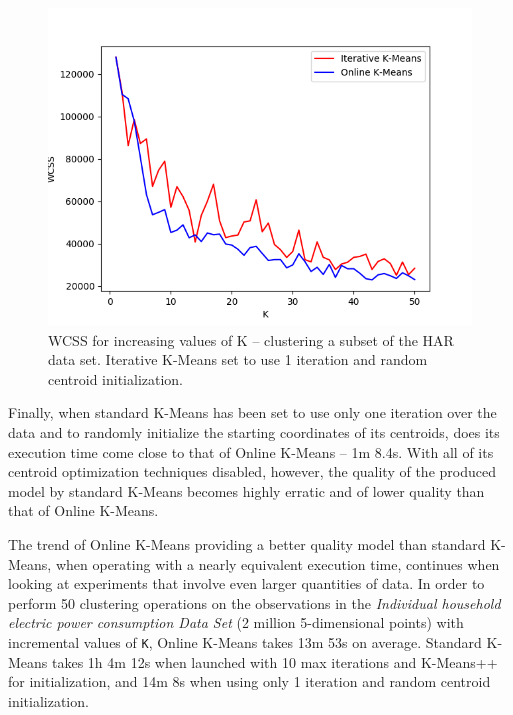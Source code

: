 \documentclass{l4proj}
\begin{document}
\begin{figure}[H]
	\centering
    \label{fig:res5}
    \includegraphics[width=1.0\textwidth]{images/result5}
    \caption{WCSS for increasing values of K -- clustering a subset of the HAR data set. Iterative K-Means set to use 1 iteration and random centroid initialization. } 
\end{figure}

Finally, when standard K-Means has been set to use only one iteration over the data  and to randomly initialize the starting coordinates of its centroids, does its execution time come close to that of Online K-Means -- 1m 8.4s. With all of its centroid optimization techniques disabled, however, the quality of the produced model by standard K-Means becomes highly erratic and of lower quality than that of Online K-Means.


The trend of Online K-Means providing a better quality model than standard K-Means, when operating with a nearly equivalent execution time, continues when looking at experiments that involve even larger quantities of data. In order to perform 50 clustering operations on the observations in the \textit{Individual household electric power consumption Data Set} (2 million 5-dimensional points) with incremental values of \texttt{K}, Online K-Means takes 13m 53s on average. Standard K-Means takes 1h 4m 12s when launched with 10 max iterations and K-Means++ for initialization,  and 14m 8s when using only 1 iteration and random centroid initialization.

\end{document}
